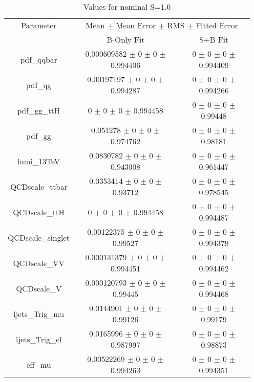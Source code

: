 \begin{table}
\centering
\caption{Values for nominal S=1.0}
\begin{tabular}{ccc}
\toprule
Parameter & \multicolumn{2}{c}{Mean $\pm$ Mean Error $\pm$ RMS $\pm$ Fitted Error}\\
 & B-Only Fit & S+B Fit\\
\midrule
pdf\_qqbar & \num{0.000609582} $\pm$ \num{0} $\pm$ \num{0} $\pm$ \num{0.994406} & \num{0} $\pm$ \num{0} $\pm$ \num{0} $\pm$ \num{0.994409}\\
pdf\_qg & \num{0.00197197} $\pm$ \num{0} $\pm$ \num{0} $\pm$ \num{0.994287} & \num{0} $\pm$ \num{0} $\pm$ \num{0} $\pm$ \num{0.994266}\\
pdf\_gg\_ttH & \num{0} $\pm$ \num{0} $\pm$ \num{0} $\pm$ \num{0.994458} & \num{0} $\pm$ \num{0} $\pm$ \num{0} $\pm$ \num{0.99448}\\
pdf\_gg & \num{0.051278} $\pm$ \num{0} $\pm$ \num{0} $\pm$ \num{0.974762} & \num{0} $\pm$ \num{0} $\pm$ \num{0} $\pm$ \num{0.98181}\\
lumi\_13TeV & \num{0.0830782} $\pm$ \num{0} $\pm$ \num{0} $\pm$ \num{0.943008} & \num{0} $\pm$ \num{0} $\pm$ \num{0} $\pm$ \num{0.961447}\\
QCDscale\_ttbar & \num{0.0353414} $\pm$ \num{0} $\pm$ \num{0} $\pm$ \num{0.93712} & \num{0} $\pm$ \num{0} $\pm$ \num{0} $\pm$ \num{0.978545}\\
QCDscale\_ttH & \num{0} $\pm$ \num{0} $\pm$ \num{0} $\pm$ \num{0.994458} & \num{0} $\pm$ \num{0} $\pm$ \num{0} $\pm$ \num{0.994487}\\
QCDscale\_singlet & \num{0.00122375} $\pm$ \num{0} $\pm$ \num{0} $\pm$ \num{0.99527} & \num{0} $\pm$ \num{0} $\pm$ \num{0} $\pm$ \num{0.994379}\\
QCDscale\_VV & \num{0.000131379} $\pm$ \num{0} $\pm$ \num{0} $\pm$ \num{0.994451} & \num{0} $\pm$ \num{0} $\pm$ \num{0} $\pm$ \num{0.994462}\\
QCDscale\_V & \num{0.000120793} $\pm$ \num{0} $\pm$ \num{0} $\pm$ \num{0.99445} & \num{0} $\pm$ \num{0} $\pm$ \num{0} $\pm$ \num{0.994468}\\
ljets\_Trig\_mu & \num{0.0144901} $\pm$ \num{0} $\pm$ \num{0} $\pm$ \num{0.99126} & \num{0} $\pm$ \num{0} $\pm$ \num{0} $\pm$ \num{0.99179}\\
ljets\_Trig\_el & \num{0.0165996} $\pm$ \num{0} $\pm$ \num{0} $\pm$ \num{0.987997} & \num{0} $\pm$ \num{0} $\pm$ \num{0} $\pm$ \num{0.98873}\\
eff\_mu & \num{0.00522269} $\pm$ \num{0} $\pm$ \num{0} $\pm$ \num{0.994263} & \num{0} $\pm$ \num{0} $\pm$ \num{0} $\pm$ \num{0.994351}\\

\end{tabular}
\end{table}
